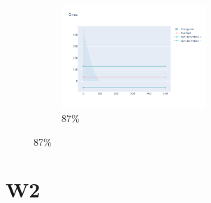 \documentclass[12pt, fleqn]{report}                             %
\theoremstyle{break}                                            %
\begin{document}
\begin{figure}[ht!]
\begin{subfigure}[b]{0.4\linewidth}
          \includegraphics[width=0.6\textwidth]{Images/168/dia-d.png}
          \caption{87\%}
        \end{subfigure}
      \end{figure}























      \clearpage
      \section{W2}
              

       

            
\end{document}
